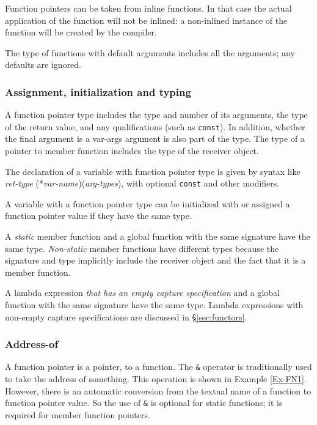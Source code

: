 {Function pointers can be taken from inline functions. In that case 
the actual application of the function will not be inlined: a 
non-inlined instance of the function will be created by the compiler.

The type of functions with default arguments includes all the arguments; any defaults are ignored.

\subsubsection{Assignment, initialization and typing}
A function pointer type includes the type and number of its arguments, the type of the return value, and any qualifications (such as 
\lstinline|const|). 
In addition, whether the final argument is a var-args
argument is also part of the type.
The type of a pointer to member function includes the type of the receiver object.

The declaration of a variable with function pointer type is given by syntax like\\
\emph{ret-type} (*\emph{var-name})(\emph{arg-types}), with optional \lstinline|const| and other modifiers.

A variable with a function pointer type can be initialized with or assigned a function pointer value if they have the same type.

A \emph{static} member function and
a global function with the same signature have the same type.
\emph{Non-static} member functions have different types because
the signature and type implicitly include the receiver object
and the fact that it is a member function.

A lambda expression \emph{that has an empty capture specification} and
a global function with the same signature have the same type.
Lambda expressions with non-empty capture specifications are discussed 
in \S\ref{sec:functors}.

\subsubsection{Address-of}

A function pointer is a pointer, to a function. 
The \lstinline|&| operator is traditionally used to take
the address of something. 
This operation is shown in Example \ref{Ex-FN1}.
However, there is an automatic conversion from the textual
name of a function to function pointer value. 
So the use of \lstinline|&| is optional for static functions; it is required for member function pointers.

}
